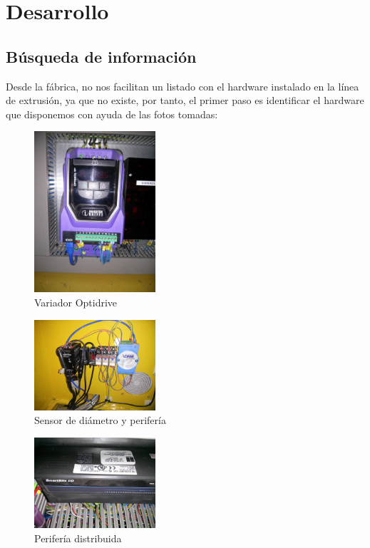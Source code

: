 \chapter{Desarrollo}
\label{cap:hardware}

\section{Búsqueda de información}
\label{busqueda_informacion}

Desde la fábrica, no nos facilitan un listado con el hardware instalado en la línea de extrusión, ya que no existe, por tanto, el primer paso es identificar el hardware que disponemos con ayuda de las fotos tomadas:
    \begin{figure}[H]
            \centering
            \includegraphics[width=0.4\textwidth]{images/huesca/IMG_20141216_174810.jpg}
            \caption{Variador Optidrive}
            \label{fig:hardware_variador}
    \end{figure}

    \begin{figure}[H]
            \centering
            \includegraphics[width=0.4\textwidth]{images/huesca/IMG_20141216_174824.jpg}
            \caption{Sensor de diámetro y perifería}
            \label{fig:hardware_diametro}
    \end{figure}

    \begin{figure}[H]
            \centering
            \includegraphics[width=0.4\textwidth]{images/huesca/IMG_20141216_174925.jpg}
            \caption{Perifería distribuida}
            \label{fig:hardware_periferia}
    \end{figure}

